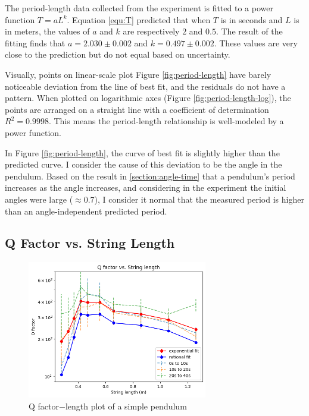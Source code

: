 \documentclass[12pt]{article}
\begin{document}
The period-length data collected from the experiment is fitted to a power function $T=aL^k$. Equation {\ref{equ:T}} predicted that when $T$ is in seconds and $L$ is in meters, the values of $a$ and $k$ are respectively $2$ and $0.5$. The result of the fitting finds that $a=2.030\pm0.002$ and $k=0.497\pm0.002$. These values are very close to the prediction but do not equal based on uncertainty.

Visually, points on linear-scale plot Figure {\ref{fig:period-length}} have barely noticeable deviation from the line of best fit, and the residuals do not have a pattern. When plotted on logarithmic axes (Figure {\ref{fig:period-length-log}}), the points are arranged on a straight line with a coefficient of determination $R^2=0.9998$. This means the period-length relationship is well-modeled by a power function.

In Figure {\ref{fig:period-length}}, the curve of best fit is slightly higher than the predicted curve. I consider the cause of this deviation to be the angle in the pendulum. Based on the result in {\ref{section:angle-time}} that a pendulum's period increases as the angle increases, and considering in the experiment the initial angles were large ($\approx 0.7$), I consider it normal that the measured period is higher than an angle-independent predicted period.


\subsection{Q Factor vs. String Length} \label{section:q-length}

\begin{figure}[!htb]
\begin{center}
\includegraphics[width=0.7\textwidth]{q-length.png}
\caption{Q factor$-$length plot of a simple pendulum}\label{fig:q-length}
\end{center}
\end{figure}
\end{document}
